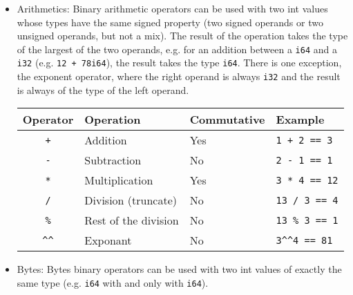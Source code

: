 \begin{itemize}
\item Arithmetics: Binary arithmetic operators can be used with two int values
  whose types have the same signed property (two signed operands or two unsigned
  operands, but not a mix). The result of the operation takes the type of the
  largest of the two operands, e.g. for an addition between a \texttt{i64} and a
  \texttt{i32} (e.g. \texttt{12 + 78i64}), the result takes the type
  \texttt{i64}. There is one exception, the exponent operator, where the right
  operand is always \texttt{i32} and the result is always of the type of the
  left operand.

  \begin{center}
    \vspace{-10pt}
    \begin{adjustbox}{max width=1.0\linewidth}
      \begin{tabular}{|c|lll|}
        \hline
        Operator & Operation & Commutative & Example\\[0pt]
        \hline
        \hline
        \texttt{+} & Addition & Yes & \texttt{1 + 2 == 3}\\[0pt]
        \texttt{-} & Subtraction & No & \texttt{2 - 1 == 1}\\[0pt]
        \texttt{*} & Multiplication & Yes & \texttt{3 * 4 == 12}\\[0pt]
        \texttt{/} & Division (truncate) & No & \texttt{13 / 3 == 4}\\[0pt]
        \texttt{\%} & Rest of the division & No & \texttt{13 \% 3 == 1}\\[0pt]
        \texttt{\textasciicircum{}\textasciicircum{}} & Exponant & No & \texttt{3\textasciicircum{}\textasciicircum{}4 == 81}\\[0pt]
        \hline
      \end{tabular}
    \end{adjustbox}
  \end{center}

\item Bytes: Bytes binary operators can be used with two int values of exactly
  the same type (e.g. \texttt{i64} with and only with \texttt{i64}).


\end{itemize}
